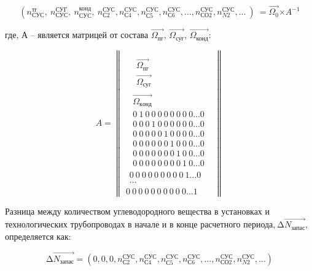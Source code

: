\begin{equation}
\left( n_{\text{СУС}}^{\text{тг}},\ n_{\text{СУС}}^{\text{СУГ}},\ n_{\text{СУС}}^{\text{конд}},\ n_{\text{С2}}^{\text{СУС}},n_{\text{С4}}^{\text{СУС}},n_{\text{С5}}^{\text{СУС}},n_{\text{С6}}^{\text{СУС}},\ldots,n_{\text{СО2}}^{\text{СУС}},n_{N2}^{\text{СУС}},\ldots\  \right)\  = \overrightarrow{\Omega_{0}}{\times A}^{- 1}
\end{equation}

\begin{multicols}{2}
где, А -- является матрицей от состава \(\overrightarrow{\Omega_{\text{пг}}}\),
\(\overrightarrow{\Omega_{\text{суг}}}\), \(\overrightarrow{\Omega_{\text{конд}}}\):

\begin{equation}
A = \left\| \begin{array}{r}
\begin{array}{r}
\begin{array}{r}
\begin{array}{r}
\overrightarrow{\Omega_{пг}} \\
\overrightarrow{\Omega_{суг}}
\end{array} \\
\overrightarrow{\Omega_{конд}} \\
0\ 1\ 0\ 0\ 0\ 0\ 0\ 0\ 0\ 0\ldots 0 \\
0\ 0\ 0\ 1\ 0\ 0\ 0\ 0\ 0\ 0\ldots 0 \\
0\ 0\ 0\ 0\ 0\ 1\ 0\ 0\ 0\ 0\ldots 0 \\
0\ 0\ 0\ 0\ 0\ 0\ 1\ 0\ 0\ 0\ldots 0 \\
0\ 0\ 0\ 0\ 0\ 0\ 0\ 1\ 0\ 0\ldots 0 \\
0\ 0\ 0\ 0\ 0\ 0\ 0\ 0\ 1\ 0\ldots 0
\end{array} \\
0\ 0\ 0\ 0\ 0\ 0\ 0\ 0\ 0\ 1\ldots 0 \\
\ldots
\end{array} \\
0\ 0\ 0\ 0\ 0\ 0\ 0\ 0\ 0\ 0\ldots 1
\end{array} \right\|
\end{equation}

Разница между количеством углеводородного вещества в установках и
технологических трубопроводах в начале и в конце расчетного
периода,\(\ \mathrm{\Delta}\overrightarrow{Ν_{\text{запас}}}\), определяется
как:

\begin{equation}
\mathrm{\Delta}\overrightarrow{Ν_{\text{запас}}} = \left( 0,0,0,n_{\text{С2}}^{\text{СУС}},n_{\text{С4}}^{\text{СУС}},n_{\text{С5}}^{\text{СУС}},n_{\text{С6}}^{\text{СУС}},\ldots,n_{\text{СО2}}^{\text{СУС}},n_{N2}^{\text{СУС}},\ldots \right)
\end{equation}


\end{multicols}
